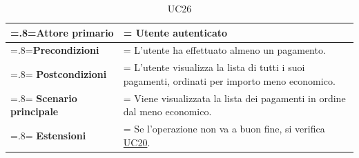             \begin{table}[H]
                \centering
                \renewcommand{\arraystretch}{1.8}
                \renewcommand\tabularxcolumn[1]{m{#1}}
                \begin{tabularx}{0.9\textwidth} {
                    >{\hsize=.8\hsize\linewidth=\hsize}X
                    >{\hsize=1.2\hsize\linewidth=\hsize}X}
                    \hline
                    \textbf{Attore primario} & Utente autenticato \\
                    \hline
                    \textbf{Precondizioni} & L'utente ha effettuato almeno un pagamento. \\
                    \hline
                    \textbf{Postcondizioni} & L'utente visualizza la lista di tutti i suoi pagamenti, ordinati per importo meno economico. \\
                    \hline
                    \textbf{Scenario principale} & Viene visualizzata la lista dei pagamenti in ordine dal meno economico. \\
                    \hline
                    \textbf{Estensioni} & Se l'operazione non va a buon fine, si verifica \hyperref[UC20]{UC20}. \\
                    \hline
                \end{tabularx}
                \caption{UC26}
            \end{table}

\pagebreak